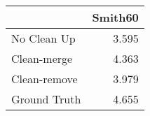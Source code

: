 \begin{tabular}{lr}
\toprule
{} & Smith60 \\
\midrule
No Clean Up  &   3.595 \\
Clean-merge  &   4.363 \\
Clean-remove &   3.979 \\
Ground Truth &   4.655 \\
\bottomrule
\end{tabular}
